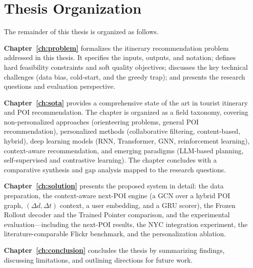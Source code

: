 \section{Thesis Organization}
\label{sec:intro-organization}

The remainder of this thesis is organized as follows.

\textbf{Chapter~\ref{ch:problem}} formalizes the itinerary recommendation problem addressed in this thesis. It specifies the inputs, outputs, and notation; defines hard feasibility constraints and soft quality objectives; discusses the key technical challenges (data bias, cold-start, and the greedy trap); and presents the research questions and evaluation perspective.

\textbf{Chapter~\ref{ch:sota}} provides a comprehensive state of the art in tourist itinerary and POI recommendation. The chapter is organized as a field taxonomy, covering non-personalized approaches (orienteering problems, general POI recommendation), personalized methods (collaborative filtering, content-based, hybrid), deep learning models (RNN, Transformer, GNN, reinforcement learning), context-aware recommendation, and emerging paradigms (LLM-based planning, self-supervised and contrastive learning). The chapter concludes with a comparative synthesis and gap analysis mapped to the research questions.

\textbf{Chapter~\ref{ch:solution}} presents the proposed system in detail: the data preparation, the context-aware next-POI engine (a GCN over a hybrid POI graph, $(\Delta d,\Delta t)$ context, a user embedding, and a GRU scorer), the Frozen Rollout decoder and the Trained Pointer comparison, and the experimental evaluation---including the next-POI results, the NYC integration experiment, the literature-comparable Flickr benchmark, and the personalization ablation.

\textbf{Chapter~\ref{ch:conclusion}} concludes the thesis by summarizing findings, discussing limitations, and outlining directions for future work.